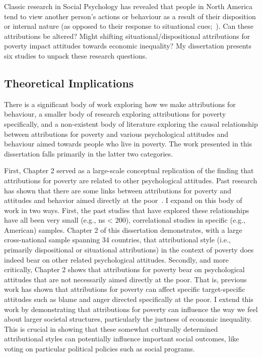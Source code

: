 \documentclass{sfuthesis}
\begin{document}
Classic research in Social Psychology has revealed that people in North America tend to view another person’s actions or behaviour as a result of their disposition or internal nature (as opposed to their response to situational cues;~\cite{gilbert95}). Can these attributions be altered? Might shifting situational/dispositional attributions for poverty impact attitudes towards economic inequality? My dissertation presents six studies to unpack these research questions.

\subsection{Theoretical Implications}

There is a significant body of work exploring how we make attributions for behaviour, a smaller body of research exploring attributions for poverty specifically, and a non-existent body of literature exploring the causal relationship between attributions for poverty and various psychological attitudes and behaviour aimed towards people who live in poverty. The work presented in this dissertation falls primarily in the latter two categories.

First, Chapter 2 served as a large-scale conceptual replication of the finding that attributions for poverty are related to other psychological attitudes. Past research has shown that there are some links between attributions for poverty and attitudes and behavior aimed directly at the poor~\cite{bullock03, cozzarelli01, zucker93}. I expand on this body of work in two ways. First, the past studies that have explored these relationships have all been very small (e.g., ns < 200), correlational studies in specific (e.g., American) samples. Chapter 2 of this dissertation demonstrates, with a large cross-national sample spanning 34 countries, that attributional style (i.e., primarily dispositional or situational attributions) in the context of poverty does indeed bear on other related psychological attitudes. Secondly, and more critically, Chapter 2 shows that attributions for poverty bear on psychological attitudes that are not necessarily aimed directly at the poor. That is, previous work has shown that attributions for poverty can affect specific target-specific attitudes such as blame and anger directed specifically at the poor. I extend this work by demonstrating that attributions for poverty can influence the way we feel about larger societal structures, particularly the justness of economic inequality. This is crucial in showing that these somewhat culturally determined attributional styles can potentially influence important social outcomes, like voting on particular political policies such as social programs.
\end{document}
